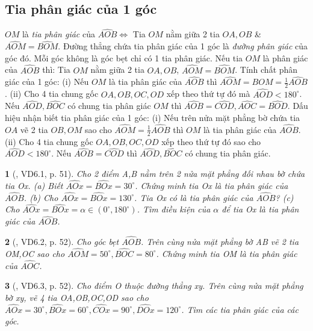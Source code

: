 \documentclass{article}
\newtheorem{baitoan}{}
\begin{document}
\subsection{Tia phân giác của 1 góc}
 $OM$ là \textit{tia phân giác} của $\widehat{AOB}\Leftrightarrow$ Tia $OM$ nằm giữa 2 tia $OA,OB$ \& $\widehat{AOM} = \widehat{BOM}$. Đường thẳng chứa tia phân giác của 1 góc là \textit{đường phân giác} của góc đó. Mỗi góc không là góc bẹt chỉ có 1 tia phân giác.  Nếu tia $OM$ là phân giác của $\widehat{AOB}$ thì: Tia $OM$ nằm giữa 2 tia $OA,OB$, $\widehat{AOM} = \widehat{BOM}$.  {\sf Tính chất phân giác của 1 góc}: (i) Nếu $OM$ là tia phân giác của $\widehat{AOB}$ thì $\widehat{AOM} = \widehat{BOM} = \frac{1}{2}\widehat{AOB}$. (ii) Cho 4 tia chung gốc $OA,OB,OC,OD$ xếp theo thứ tự đó mà $\widehat{AOD} < 180^\circ$. Nếu $\widehat{AOD},\widehat{BOC}$ có chung tia phân giác $OM$ thì $\widehat{AOB} = \widehat{COD},\widehat{AOC} = \widehat{BOD}$.  {\sf Dấu hiệu nhận biết tia phân giác của 1 góc}: (i) Nếu trên nửa mặt phẳng bờ chứa tia $OA$ vẽ 2 tia $OB,OM$ sao cho $\widehat{AOM} = \frac{1}{2}\widehat{AOB}$ thì $OM$ là tia phân giác của $\widehat{AOB}$. (ii) Cho 4 tia chung gốc $OA,OB,OC,OD$ xếp theo thứ tự đó sao cho $\widehat{AOD} < 180^\circ$. Nếu $\widehat{AOB} = \widehat{COD}$ thì $\widehat{AOD},\widehat{BOC}$ có chung tia phân giác.

\begin{baitoan}[\cite{TLCT_THCS_Toan_6_hinh_hoc}, VD6.1, p. 51]
	Cho 2 điểm A,B nằm trên 2 nửa mặt phẳng đối nhau bờ chứa tia Ox. (a) Biết $\widehat{AOx} = \widehat{BOx} = 30^\circ$. Chứng minh tia Ox là tia phân giác của $\widehat{AOB}$. (b) Cho $\widehat{AOx} = \widehat{BOx} = 130^\circ$. Tia Ox có là tia phân giác của $\widehat{AOB}$? (c) Cho $\widehat{AOx} = \widehat{BOx} = \alpha\in(0^\circ,180^\circ)$. Tìm điều kiện của $\alpha$ để tia Ox là tia phân giác của $\widehat{AOB}$.
\end{baitoan}

\begin{baitoan}[\cite{TLCT_THCS_Toan_6_hinh_hoc}, VD6.2, p. 52]
	Cho góc bẹt $\widehat{AOB}$. Trên cùng nửa mặt phẳng bờ AB vẽ 2 tia OM,OC sao cho $\widehat{AOM} = 50^\circ,\widehat{BOC} = 80^\circ$. Chứng minh tia OM là tia phân giác của $\widehat{AOC}$.
\end{baitoan}

\begin{baitoan}[\cite{TLCT_THCS_Toan_6_hinh_hoc}, VD6.3, p. 52]
	Cho điểm O thuộc đường thẳng xy. Trên cùng nửa mặt phẳng bờ xy, vẽ 4 tia OA,OB,OC,OD sao cho $\widehat{AOx} = 30^\circ,\widehat{BOx} = 60^\circ,\widehat{COx} = 90^\circ,\widehat{DOx} = 120^\circ$. Tìm các tia phân giác của các góc.
\end{baitoan}
\end{document}
